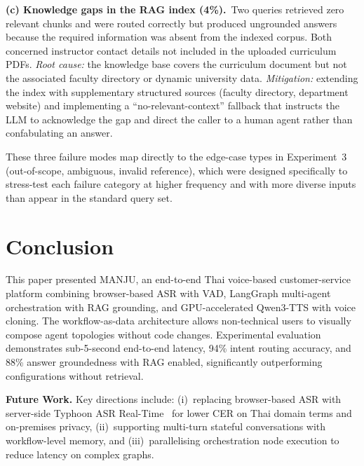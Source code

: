\documentclass[10pt, a4paper, twocolumn]{article}
\begin{document}
\noindent\textbf{(c) Knowledge gaps in the RAG index (4\%).}\
Two queries retrieved zero relevant chunks and were routed correctly
but produced ungrounded answers because the required information was
absent from the indexed corpus.
Both concerned instructor contact details not included in the
uploaded curriculum PDFs.
\textit{Root cause:} the knowledge base covers the curriculum document
but not the associated faculty directory or dynamic university data.
\textit{Mitigation:} extending the index with supplementary structured
sources (faculty directory, department website) and implementing a
``no-relevant-context'' fallback that instructs the LLM to acknowledge
the gap and direct the caller to a human agent rather than confabulating
an answer.

\noindent These three failure modes map directly to the edge-case types
in Experiment~3 (out-of-scope, ambiguous, invalid reference), which
were designed specifically to stress-test each failure category at
higher frequency and with more diverse inputs than appear in the
standard query set.

\section{Conclusion}
\label{sec:conclusion}

This paper presented MANJU, an end-to-end Thai voice-based customer-service platform combining browser-based ASR with VAD, LangGraph multi-agent orchestration with RAG grounding, and GPU-accelerated Qwen3-TTS with voice cloning.
The workflow-as-data architecture allows non-technical users to visually compose agent topologies without code changes.
Experimental evaluation demonstrates sub-5-second end-to-end latency, 94\% intent routing accuracy, and 88\% answer groundedness with RAG enabled, significantly outperforming configurations without retrieval.

\noindent\textbf{Future Work.}
Key directions include: (i)~replacing browser-based ASR with server-side Typhoon ASR Real-Time~\cite{sirichotedumrong2026typhoonasr} for lower CER on Thai domain terms and on-premises privacy, (ii)~supporting multi-turn stateful conversations with workflow-level memory, and (iii)~parallelising orchestration node execution to reduce latency on complex graphs.



\end{document}

